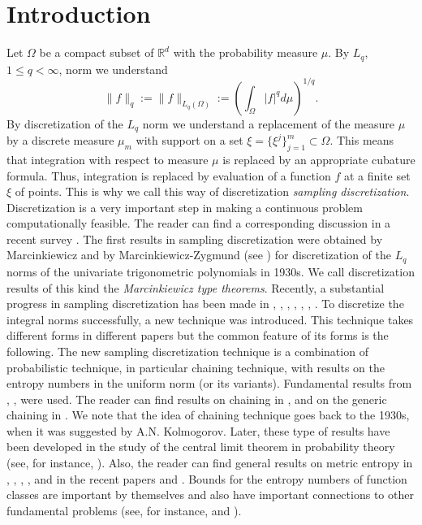 \documentclass[12pt]{article}
\def\R{{\mathbb R}}
\numberwithin{equation}{section}
\begin{document}
\section{Introduction}
\label{I}

Let $\Omega$ be a compact subset of $\R^d$ with the probability measure $\mu$. By $L_q$, $1\le q< \infty$, norm we understand
$$
\|f\|_q:=\|f\|_{L_q(\Omega)} := \left(\int_\Omega |f|^qd\mu\right)^{1/q}.
$$
By discretization of the $L_q$ norm we understand a replacement of the measure $\mu$ by
a discrete measure $\mu_m$ with support on a set $\xi =\{\xi^j\}_{j=1}^m \subset \Omega$. This means that integration with respect to measure $\mu$ is replaced by an appropriate cubature formula. Thus, integration is replaced by evaluation of a function $f$ at a
finite set $\xi$ of points. This is why we call this way of discretization {\it sampling discretization}. Discretization is
a very important step in making a continuous problem computationally feasible. The reader can find a corresponding discussion in a recent survey \cite{DPTT}. The first results in sampling discretization were obtained by Marcinkiewicz and
by Marcinkiewicz-Zygmund (see \cite{Z}) for discretization of the $L_q$ norms of the univariate trigonometric polynomials in 1930s. We call discretization results of this kind the {\it Marcinkiewicz type theorems}. Recently, a substantial progress in sampling discretization has been made in \cite{VT158}, \cite{VT159}, \cite{DPTT}, \cite{VT168}, \cite{DPSTT1}, \cite{DPSTT2}, \cite{Kos}. To discretize  the integral norms successfully, a  new technique was introduced.  This technique takes different forms in different papers but the common feature of its forms is the following. The new sampling discretization technique is a combination of probabilistic technique, in particular chaining technique, with results on the entropy numbers in the uniform norm (or its variants). Fundamental results from \cite{BLM}, \cite{Tal}, \cite{MSS} were used. The reader can find 
results on chaining in \cite{KoTe}, \cite{Tbook} and on the generic chaining in \cite{Tal}.  We note that the idea of chaining technique goes back to the 1930s, when it was suggested by A.N. Kolmogorov. Later, these type of results have been developed in the study of the central limit theorem in probability theory (see, for instance, \cite{GZ}).
Also, the reader can find general results on metric entropy in \cite[Ch.15]{LGM},  \cite[Ch.3]{Tbook}, \cite[Ch.7]{VTbookMA}, \cite{Carl},
\cite{Schu} and in the recent papers \cite{VT156} and  \cite{HPV}.
Bounds for the entropy numbers of function classes are important by themselves and also have important connections to other fundamental problems (see, for instance, \cite[Ch.3]{Tbook} and \cite[Ch.6]{DTU}).
\end{document}
